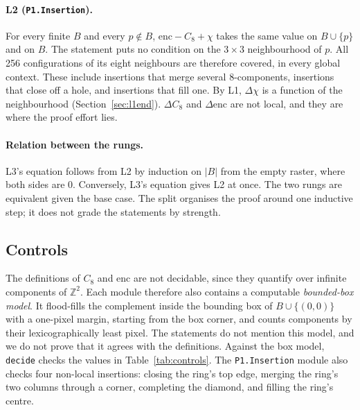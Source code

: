 \documentclass[11pt]{article}
\theoremstyle{definition}
\theoremstyle{remark}
\begin{document}
\paragraph{L2 (\texttt{P1.Insertion}).} For every finite $B$ and every
$p\notin B$, $\mathrm{enc}-C_8+\chi$ takes the same value on $B\cup\{p\}$ and on
$B$. The statement puts no condition on the $3\times3$ neighbourhood of $p$. All
256 configurations of its eight neighbours are therefore covered, in every global
context. These include insertions that merge several 8-components, insertions
that close off a hole, and insertions that fill one. By L1, $\Delta\chi$ is a
function of the neighbourhood (Section~\ref{sec:l1end}). $\Delta C_8$ and
$\Delta\mathrm{enc}$ are not local, and they are where the proof effort lies.

\paragraph{Relation between the rungs.} L3's equation follows from L2 by
induction on $|B|$ from the empty raster, where both sides are $0$. Conversely,
L3's equation gives L2 at once. The two rungs are equivalent given the base case.
The split organises the proof around one inductive step; it does not grade the
statements by strength.

\subsection{Controls}

The definitions of $C_8$ and $\mathrm{enc}$ are not decidable, since they
quantify over infinite components of $\mathbb{Z}^2$. Each module therefore also
contains a computable \emph{bounded-box model}. It flood-fills the complement
inside the bounding box of $B\cup\{(0,0)\}$ with a one-pixel margin, starting
from the box corner, and counts components by their lexicographically least
pixel. The statements do not mention this model, and we do not prove that it
agrees with the definitions. Against the box model, \texttt{decide} checks the
values in Table~\ref{tab:controls}. The \texttt{P1.Insertion} module also checks
four non-local insertions: closing the ring's top edge, merging the ring's two
columns through a corner, completing the diamond, and filling the ring's centre.
\end{document}
